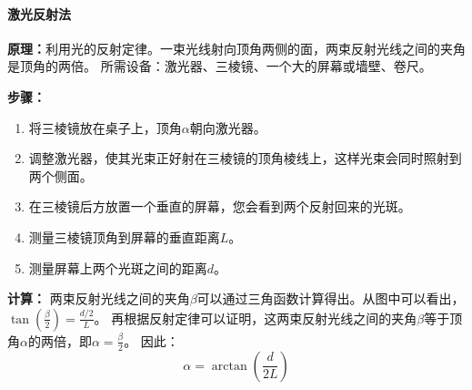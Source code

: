 \documentclass{../template/Report}%
\begin{document}
\paragraph{激光反射法}
\textbf{原理：}利用光的反射定律。一束光线射向顶角两侧的面，两束反射光线之间的夹角是顶角的两倍。
所需设备：激光器、三棱镜、一个大的屏幕或墙壁、卷尺。

\textbf{步骤：}

\begin{enumerate}[label=\textbf{Step }\arabic{*}.]
  \item 将三棱镜放在桌子上，顶角$\alpha$朝向激光器。
  \item 调整激光器，使其光束正好射在三棱镜的顶角棱线上，这样光束会同时照射到两个侧面。
  \item 在三棱镜后方放置一个垂直的屏幕，您会看到两个反射回来的光斑。
  \item 测量三棱镜顶角到屏幕的垂直距离$L$。
  \item 测量屏幕上两个光斑之间的距离$d$。
\end{enumerate}

\textbf{计算：}
两束反射光线之间的夹角$\beta$可以通过三角函数计算得出。从图中可以看出，$ \tan(\frac{\beta}{2}) = \frac{d/2}{L} $。
再根据反射定律可以证明，这两束反射光线之间的夹角$\beta$等于顶角$\alpha$的两倍，即$\alpha = \frac{\beta}{2}$。
因此：
\[
\alpha = \arctan(\frac{d}{2L})
\]
\insertnotes
\end{document}
